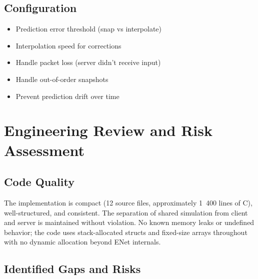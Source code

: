 \documentclass[11pt]{article}
\begin{document}
\subsection{Configuration}

\begin{itemize}
  \item Prediction error threshold (snap vs interpolate)
  \item Interpolation speed for corrections
  \item Handle packet loss (server didn't receive input)
  \item Handle out-of-order snapshots
  \item Prevent prediction drift over time
\end{itemize}

\section{Engineering Review and Risk Assessment}

\subsection{Code Quality}

The implementation is compact (12 source files, approximately 1~400 lines of C), well-structured, and consistent. The separation of shared simulation from client and server is maintained without violation. No known memory leaks or undefined behavior; the code uses stack-allocated structs and fixed-size arrays throughout with no dynamic allocation beyond ENet internals.

\subsection{Identified Gaps and Risks}
\end{document}
